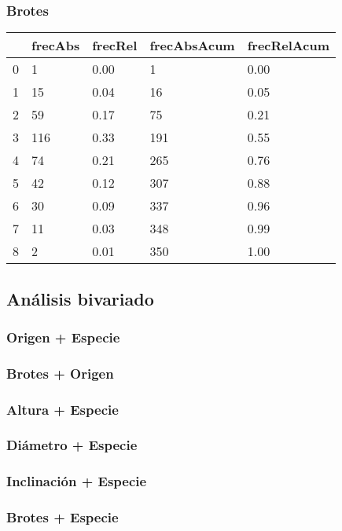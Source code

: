 \documentclass[titlepage, 12pt]{article}
\begin{document}
\subsubsection{Brotes}

\begin{table}[H]
  \begin{tabularx}{\textwidth}{|c|X|X|X|X|}
    \hline
      & frecAbs & frecRel & frecAbsAcum & frecRelAcum \\ \hline
    0 & 1       & 0.00    & 1           & 0.00        \\ \hline
    1 & 15      & 0.04    & 16          & 0.05        \\ \hline
    2 & 59      & 0.17    & 75          & 0.21        \\ \hline
    3 & 116     & 0.33    & 191         & 0.55        \\ \hline
    4 & 74      & 0.21    & 265         & 0.76        \\ \hline
    5 & 42      & 0.12    & 307         & 0.88        \\ \hline
    6 & 30      & 0.09    & 337         & 0.96        \\ \hline
    7 & 11      & 0.03    & 348         & 0.99        \\ \hline
    8 & 2       & 0.01    & 350         & 1.00        \\ \hline
  \end{tabularx}
\end{table}

\subsection{Análisis bivariado}

\subsubsection{Origen + Especie}

\subsubsection{Brotes + Origen}

\subsubsection{Altura + Especie}

\subsubsection{Diámetro + Especie}

\subsubsection{Inclinación + Especie}

\subsubsection{Brotes + Especie}
\end{document}
